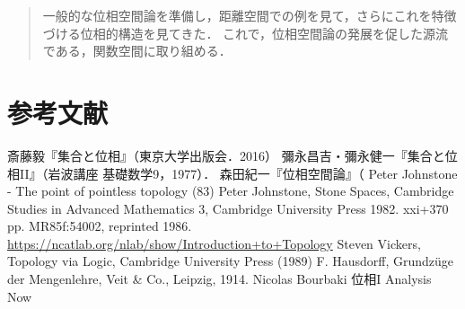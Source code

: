 \documentclass[uplatex,dvipdfmx]{jsreport}
\begin{document}
\begin{quotation}
    一般的な位相空間論を準備し，距離空間での例を見て，さらにこれを特徴づける位相的構造を見てきた．
    これで，位相空間論の発展を促した源流である，関数空間に取り組める．
\end{quotation}

\chapter{参考文献}

\begin{thebibliography}{99}
    斎藤毅『集合と位相』（東京大学出版会．2016）
    彌永昌吉・彌永健一『集合と位相II』（岩波講座 基礎数学9，1977）．
    森田紀一『位相空間論』（
        Peter Johnstone - The point of pointless topology (83)
        Peter Johnstone, Stone Spaces, Cambridge Studies in Advanced Mathematics 3, Cambridge University Press 1982. xxi+370 pp. MR85f:54002, reprinted 1986.
        \url{https://ncatlab.org/nlab/show/Introduction+to+Topology}
        Steven Vickers, Topology via Logic, Cambridge University Press (1989)
    F. Hausdorff, Grundzüge der Mengenlehre, Veit \& Co., Leipzig, 1914.
    Nicolas Bourbaki 位相I
    Analysis Now
\end{thebibliography}
\end{document}
